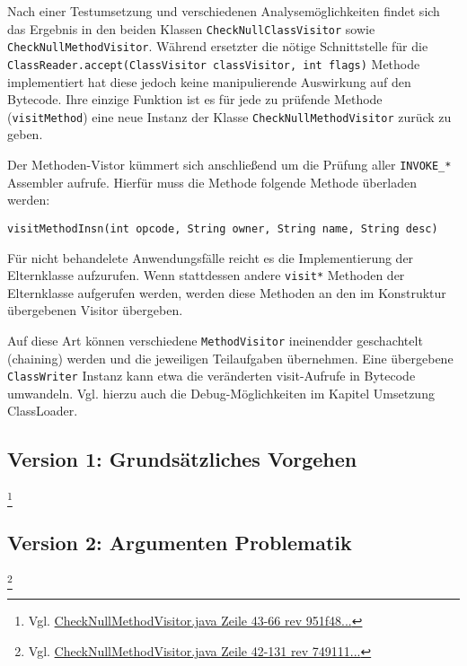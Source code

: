 Nach einer Testumsetzung und verschiedenen Analysemöglichkeiten findet sich
das Ergebnis in den beiden Klassen \texttt{CheckNullClassVisitor} sowie
\texttt{CheckNullMethodVisitor}. Während ersetzter die nötige Schnittstelle für die
\texttt{ClassReader.accept(ClassVisitor classVisitor, int flags)} Methode implementiert
hat diese jedoch keine manipulierende Auswirkung auf den Bytecode. Ihre
einzige Funktion ist es für jede zu prüfende Methode (\texttt{visitMethod})
eine neue Instanz der Klasse \texttt{CheckNullMethodVisitor} zurück zu geben.

Der Methoden-Vistor kümmert sich anschließend um die Prüfung aller \texttt{INVOKE_*}
Assembler aufrufe. Hierfür muss die Methode folgende Methode überladen werden:

\texttt{visitMethodInsn(int opcode, String owner, String name, String desc)}

Für nicht behandelete Anwendungsfälle reicht es die Implementierung der Elternklasse
aufzurufen. Wenn stattdessen andere \texttt{visit*} Methoden der Elternklasse aufgerufen
werden, werden diese Methoden an den im Konstruktur übergebenen Visitor übergeben.

Auf diese Art können verschiedene \texttt{MethodVisitor} ineinendder geschachtelt
(chaining) werden und die jeweiligen Teilaufgaben übernehmen. Eine übergebene \texttt{ClassWriter}
Instanz kann etwa die veränderten visit-Aufrufe in Bytecode umwandeln. Vgl. hierzu
auch die Debug-Möglichkeiten im Kapitel Umsetzung ClassLoader.

\subsection{Version 1: Grundsätzliches Vorgehen}


\footnote{Vgl. \href{https://github.com/jerolimov/java-hardener/blob/951f48194f53baebd0915c01e0ed3cc2596bd0db/src/main/java/de/fhkoeln/gm/cui/javahardener/CheckNullMethodVisitor.java\#L43-66}{CheckNullMethodVisitor.java Zeile 43-66 rev 951f48...}}

\subsection{Version 2: Argumenten Problematik}

\footnote{Vgl. \href{https://github.com/jerolimov/java-hardener/blob/749111f5dcc3f71a1d1db5a669591288245e912b/src/main/java/de/fhkoeln/gm/cui/javahardener/CheckNullMethodVisitor.java\#L42-131}{CheckNullMethodVisitor.java Zeile 42-131 rev 749111...}}

